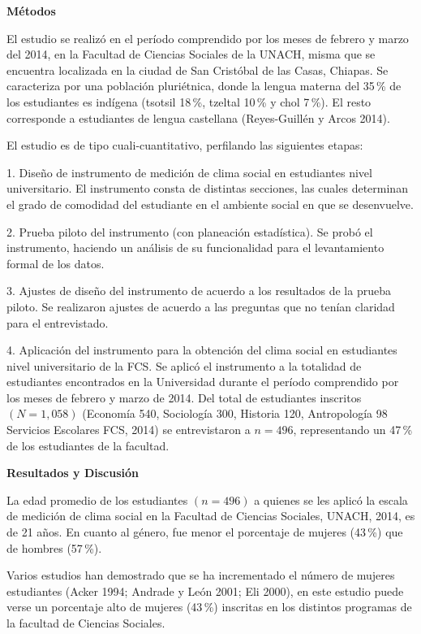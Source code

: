  
\textbf{Métodos}

 
El estudio se realizó en el período comprendido por los meses de febrero y
marzo del 2014, en la Facultad de Ciencias Sociales de la UNACH, misma que
se encuentra localizada en la ciudad de San Cristóbal de las Casas,
Chiapas. Se caracteriza por una población pluriétnica, donde la lengua
materna del 35\,\% de los estudiantes es indígena (tsotsil 18\,\%,  tzeltal
10\,\% y chol 7\,\%). El resto corresponde a estudiantes de lengua castellana
 (Reyes-Guillén y Arcos 2014).

 El estudio es de tipo cuali-cuantitativo, perfilando las siguientes etapas:
\enlargethispage{1\baselineskip}
\begin{Obs}
\item[1.]  Diseño de instrumento de medición de clima social en estudiantes nivel
universitario. El instrumento consta de distintas secciones, las cuales
determinan el grado de comodidad del estudiante en el ambiente social en
que se desenvuelve.
\item[2.]  Prueba piloto del instrumento (con planeación estadística). Se probó el
instrumento, haciendo un análisis de su funcionalidad para el levantamiento
formal de los datos.
\item[3.]  Ajustes de diseño del instrumento de acuerdo a los resultados de la prueba
piloto. Se realizaron ajustes de acuerdo a las preguntas que no tenían
claridad para el entrevistado.
\item[4.]  Aplicación del instrumento para la obtención del clima social en estudiantes
nivel universitario de la FCS. Se aplicó el instrumento a la totalidad de
estudiantes encontrados en la Universidad durante el período comprendido
por los meses de febrero y marzo de 2014. Del total de estudiantes
inscritos $(N = 1,058)$ (Economía 540, Sociología 300, Historia 120,
Antropología 98 Servicios Escolares FCS, 2014) se entrevistaron a $n = 496$,
representando un 47\,\% de los estudiantes de la facultad.
\end{Obs}


\medskip
\textbf{Resultados y Discusión}
 
La edad promedio de los estudiantes $(n = 496)$ a quienes se les aplicó la
escala de medición de clima social en la Facultad de Ciencias Sociales,
UNACH, 2014, es de 21 años. En cuanto al género, fue menor el porcentaje de
mujeres (43\,\%) que de hombres (57\,\%).

 
Varios estudios han demostrado que se ha incrementado el número de mujeres
estudiantes  (Acker 1994; Andrade  y  León 2001; Eli 2000), en este
estudio puede verse un porcentaje alto de mujeres (43\,\%) inscritas en los
distintos programas de la facultad de Ciencias Sociales.

